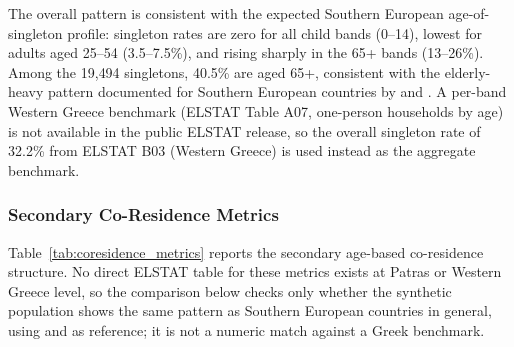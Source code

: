 \documentclass{article}
\begin{document}
The overall pattern is consistent with the expected Southern European age-of-singleton profile: singleton rates are zero for all child bands (0--14), lowest for adults aged 25--54 (3.5--7.5\%), and rising sharply in the 65+ bands (13--26\%). Among the 19{,}494 singletons, 40.5\% are aged 65+, consistent with the elderly-heavy pattern documented for Southern European countries by \citet{Iacovou2011HouseholdEU} and \citet{Reher1998}. A per-band Western Greece benchmark (ELSTAT Table A07, one-person households by age) is not available in the public ELSTAT release, so the overall singleton rate of 32.2\% from ELSTAT B03 (Western Greece) is used instead as the aggregate benchmark.

\subsubsection*{Secondary Co-Residence Metrics}

Table~\ref{tab:coresidence_metrics} reports the secondary age-based co-residence structure. No direct ELSTAT table for these metrics exists at Patras or Western Greece level, so the comparison below checks only whether the synthetic population shows the same pattern as Southern European countries in general, using \citet{Iacovou2011HouseholdEU} and \citet{Reher1998} as reference; it is not a numeric match against a Greek benchmark.
\end{document}
